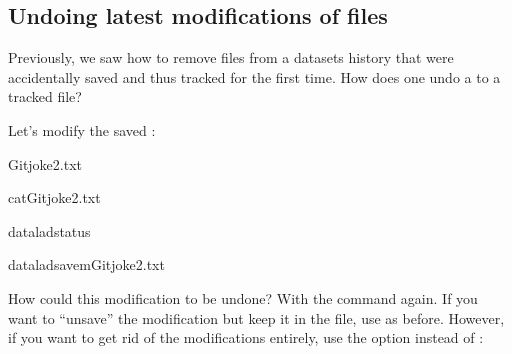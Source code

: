 \subsection{Undoing latest modifications of files}
\label{\detokenize{basics/101-137-history:undoing-latest-modifications-of-files}}
\sphinxAtStartPar
Previously, we saw how to remove files from a datasets history that
were accidentally saved and thus tracked for the first time.
How does one undo a  to a tracked file?

\newpage
\sphinxAtStartPar
Let’s modify the saved :

\begin{sphinxVerbatim}[commandchars=\\\{\}]
\PYGZgt{}\PYGZgt{}Gitjoke2.txt
\end{sphinxVerbatim}

\begin{sphinxVerbatim}[commandchars=\\\{\}]
catGitjoke2.txt
\end{sphinxVerbatim}

\begin{sphinxVerbatim}[commandchars=\\\{\}]
dataladstatus
\end{sphinxVerbatim}

\begin{sphinxVerbatim}[commandchars=\\\{\}]
dataladsave\PYGZhy{}mGitjoke2.txt
\end{sphinxVerbatim}

\sphinxAtStartPar
How could this modification to  be undone?
With the  command again. If you want to
“unsave” the modification but keep it in the file, use
 as before. However, if you want to
get rid of the modifications entirely, use the option 
instead of :

